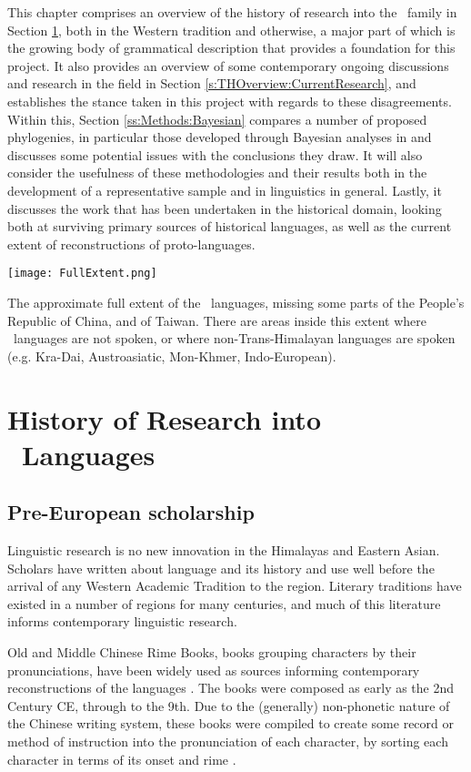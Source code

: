 This chapter comprises an overview of the history of research into the \lfam\ family in Section \ref{s:historyofresearch}, both in the Western tradition and otherwise, a major part of which is the growing body of grammatical description that provides a foundation for this project. It also provides an overview of some contemporary ongoing discussions and research in the field in Section \ref{s:THOverview:CurrentResearch}, and establishes the stance taken in this project with regards to these disagreements. Within this, Section \ref{ss:Methods:Bayesian} compares a number of proposed phylogenies, in particular those developed through Bayesian analyses in  and discusses some potential issues with the conclusions they draw. It will also consider the usefulness of these methodologies and their results both in the development of a representative sample and in linguistics in general. Lastly, it discusses the work that has been undertaken in the historical domain, looking both at surviving primary sources of historical languages, as well as the current extent of reconstructions of proto-languages.

\begin{map}
\centering
\texttt{[image: FullExtent.png]}
\caption{The approximate full extent of the \lfam\ languages, missing some parts of the People's Republic of China, and of Taiwan. There are areas inside this extent where \lfam\ languages are not spoken, or where non-Trans-Himalayan languages are spoken (e.g. Kra-Dai, Austroasiatic, Mon-Khmer, Indo-European).}
\label{fig:OverallMap}
\end{map}


\section{History of Research into \lfam\ Languages}\label{s:historyofresearch}
\subsection{Pre-European scholarship}
Linguistic research is no new innovation in the Himalayas and Eastern Asian. Scholars have written about language and its history and use well before the arrival of any Western Academic Tradition to the region. Literary traditions have existed in a number of regions for many centuries, and much of this literature informs contemporary linguistic research.

Old and Middle Chinese Rime Books, books grouping characters by their pronunciations, have been widely used as sources informing contemporary reconstructions of the languages \cite{Baxter1992}. The books were composed as early as the 2nd Century CE, through to the 9th. Due to the (generally) non-phonetic nature of the Chinese writing system, these books were compiled to create some record or method of instruction into the pronunciation of each character, by sorting each character in terms of its onset and rime \cite{Ji2021}.

